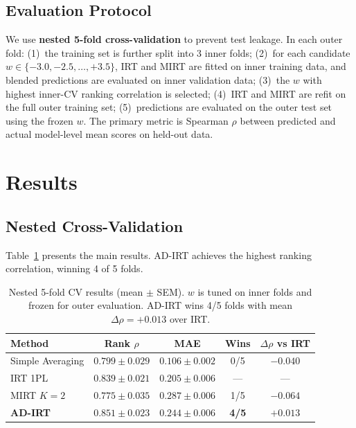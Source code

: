 \documentclass[11pt]{article}
\begin{document}
\subsection{Evaluation Protocol}

We use \textbf{nested 5-fold cross-validation} to prevent test leakage. In each outer fold: (1)~the training set is further split into 3 inner folds; (2)~for each candidate $w \in \{-3.0, -2.5, \ldots, +3.5\}$, IRT and MIRT are fitted on inner training data, and blended predictions are evaluated on inner validation data; (3)~the $w$ with highest inner-CV ranking correlation is selected; (4)~IRT and MIRT are refit on the full outer training set; (5)~predictions are evaluated on the outer test set using the frozen $w$. The primary metric is Spearman $\rho$ between predicted and actual model-level mean scores on held-out data.

\FloatBarrier
\section{Results}

\subsection{Nested Cross-Validation}

Table~\ref{tab:cv} presents the main results. AD-IRT achieves the highest ranking correlation, winning 4 of 5 folds.

\begin{table}[htbp]
\centering
\caption{Nested 5-fold CV results (mean $\pm$ SEM). $w$ is tuned on inner folds and frozen for outer evaluation. AD-IRT wins 4/5 folds with mean $\Delta\rho = +0.013$ over IRT.}
\label{tab:cv}
\begin{tabular}{lcccc}
\toprule
Method & Rank $\rho$ & MAE & Wins & $\Delta\rho$ vs IRT \\
\midrule
Simple Averaging & $0.799 \pm 0.029$ & $\mathbf{0.106 \pm 0.002}$ & 0/5 & $-0.040$ \\
IRT 1PL & $0.839 \pm 0.021$ & $0.205 \pm 0.006$ & --- & --- \\
MIRT $K\!=\!2$ & $0.775 \pm 0.035$ & $0.287 \pm 0.006$ & 1/5 & $-0.064$ \\
\textbf{AD-IRT} & $\mathbf{0.851 \pm 0.023}$ & $0.244 \pm 0.006$ & \textbf{4/5} & $+0.013$ \\
\bottomrule
\end{tabular}
\end{table}
\end{document}
